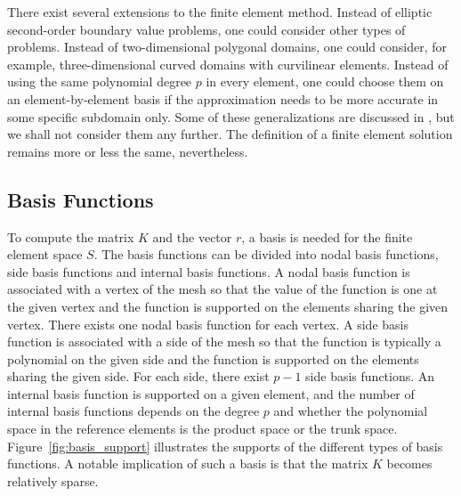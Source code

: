 \documentclass[english, 12pt, a4paper, sci, utf8, a-2b, online]{aaltothesis}
\theoremstyle{definition}
\theoremstyle{plain}
\numberwithin{equation}{section}
\begin{document}
There exist several extensions to the finite element method.
Instead of elliptic second-order boundary value problems,
one could consider other types of problems.
Instead of two-dimensional polygonal domains,
one could consider, for example, three-dimensional curved domains with curvilinear elements.
Instead of using the same polynomial degree $p$ in every element, one could choose them
on an element-by-element basis if the approximation needs to be more accurate
in some specific subdomain only. Some of these generalizations
are discussed in \cite{szabobabuska2011},
but we shall not consider them any further.
The definition of a finite element solution remains more or less the same, nevertheless.

\subsection{Basis Functions}
\label{subsec:fem_basis_functions}

To compute the matrix $K$ and the vector $r$,
a basis is needed for the finite element space $S$.
The basis functions can be divided into
nodal basis functions, side basis functions and internal basis functions.
A nodal basis function is associated with a vertex of the mesh
so that the value of the function is one at the given vertex and
the function is supported on the elements sharing the given vertex.
There exists one nodal basis function for each vertex.
A side basis function is associated with a side of the mesh
so that the function is typically a polynomial on the given side and
the function is supported on the elements sharing the given side.
For each side, there exist $p-1$ side basis functions.
An internal basis function is supported on a given element, and
the number of internal basis functions depends on the degree $p$ and
whether the polynomial space in the reference elements is the product space or the trunk space.
Figure~\ref{fig:basis_support} illustrates the supports of the different types of basis functions.
A notable implication of such a basis is that the matrix $K$ becomes relatively sparse.
\end{document}

